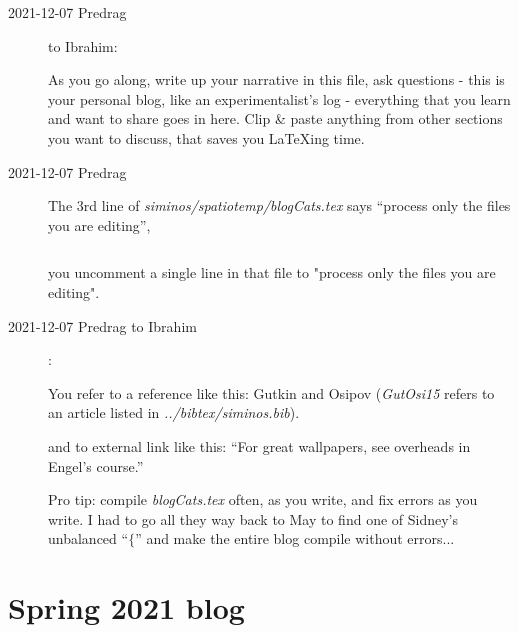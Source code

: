 \begin{description}

\item[2021-12-07 Predrag] to Ibrahim:

As you go along, write up your narrative in this file, ask questions -
this is your personal blog, like an experimentalist's log - everything
that you learn and want to share goes in here.
Clip \& paste anything from other sections you
want to discuss, that saves you LaTeXing time.

\item[2021-12-07 Predrag]
The 3rd line of  \emph{siminos/spatiotemp/blogCats.tex}
says ``process only the files you are editing'',
\begin{verbatim}

\end{verbatim}
you uncomment a single line in that file to "process  only the files you
are editing".

\item[2021-12-07 Predrag to Ibrahim]:




You refer to a reference like this: Gutkin and Osipov
(\emph{GutOsi15}
refers to an article listed in \emph{../bibtex/siminos.bib}).

and to external link like this:
``For great wallpapers, see overheads in
{Engel's} course.''

Pro tip: compile \emph{blogCats.tex} often, as you write, and fix errors as
you write. I had to go all they way back to May to find one of Sidney's
unbalanced ``$\{$'' and make the entire blog compile without errors...

\end{description}

\section{Spring 2021 blog}
\label{sect:ibrahim2021}

